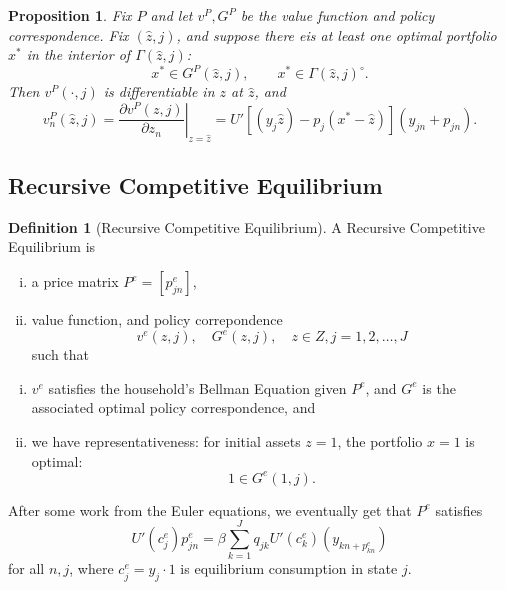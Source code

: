 \documentclass{tufte-handout}
\newtheorem{prop}[thm]{Proposition}
\theoremstyle{definition}
\newtheorem{defn}[thm]{Definition}
\begin{document}
\begin{prop}
	Fix $P$ and let $v^P, G^P$ be the value function and policy correspondence. Fix $(\hat{z},j)$, and suppose there eis at least one optimal portfolio $x^*$ in the interior of $\Gamma(\hat{z}, j)$: \[
		x^* \in G^P(\hat{z},j), \qquad x^* \in \Gamma(\hat{z},j)^{\circ}
	.\] Then $v^P(\cdot ,j)$ is differentiable in $z$ at $\hat{z}$, and \[
		v_n^P(\hat{z},j) = \left. \frac{\partial v^P(z,j)}{\partial z_n} \right|_{z = \hat{z}} = U'\left[ (y_j\hat{z}) - p_j \left( x^* - \hat{z} \right) \right]\left( y_{jn} + p_{jn} \right)
	.\] 
\end{prop}

\subsection{Recursive Competitive Equilibrium}
\begin{defn}[Recursive Competitive Equilibrium]
	A Recursive Competitive Equilibrium is
	\begin{enumerate}[(i)]
		\item a price matrix $P^e = \left[ p_{jn}^{e} \right]$,
		\item value function, and policy correpondence \[
			v^e(z,j), \quad G^e(z,j), \quad z \in Z, j = 1,2,\ldots,J
		\] such that
	\end{enumerate}
	\begin{enumerate}[(i)]
		\item $v^e$ satisfies the household's Bellman Equation given $P^e$, and $G^e$ is the associated optimal policy correspondence, and
		\item we have representativeness: for initial assets $z = 1$, the portfolio $x = 1$ is optimal: \[
			1 \in G^e(1,j)
		.\] 
	\end{enumerate}

\end{defn}

After some work from the Euler equations, we eventually get that $P^e$ satisfies \[
	U'(c_j^e) p_{jn}^{e} = \beta \sum\limits_{k=1}^{J} q_{jk} U'(c_k^{e}) \left( y_{kn + p_{kn}^{e}} \right)
\] for all $n,j$, where $c_j^{e} = y_j \cdot 1$ is equilibrium consumption in state $j$.
\end{document}
